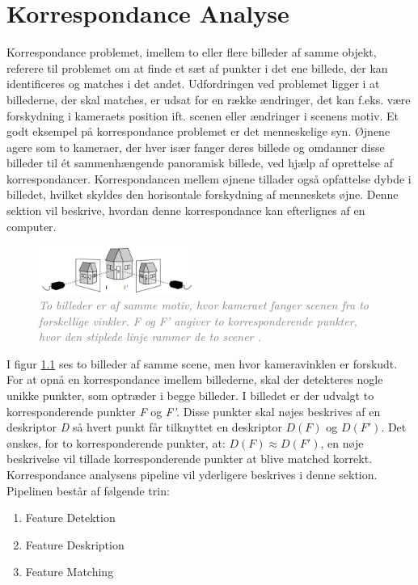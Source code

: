 \chapter{Korrespondance Analyse} \label{sec:Kor}
Korrespondance problemet, imellem to eller flere billeder af samme objekt, referere til problemet om at finde et sæt af punkter i det ene billede, der kan identificeres og matches i det andet.
Udfordringen ved problemet ligger i at billederne, der skal matches, er udsat for en række ændringer, det kan f.eks. være forskydning i kameraets position ift. scenen eller  ændringer i scenens motiv. Et godt eksempel på korrespondance problemet er det menneskelige syn. Øjnene agere som to kameraer, der hver især fanger deres billede og omdanner disse billeder til ét sammenhængende panoramisk billede, ved hjælp af oprettelse af korrespondancer. Korrespondancen mellem øjnene tillader også opfattelse dybde i billedet, hvilket skyldes den horisontale forskydning af menneskets øjne. Denne sektion vil beskrive, hvordan denne korrespondance kan efterlignes af en computer.
\begin{figure}[H]
    \centering
    \includegraphics[width=0.45\textwidth]{fig/3.png}
     \vspace{-1em}
    \begin{center}    
       \caption{\textcolor{gray}{\footnotesize \textit{To billeder er af samme motiv, hvor kameraet fanger scenen fra to forskellige vinkler. F og F' angiver to korresponderende punkter, hvor den stiplede linje rammer de to scener \cite{kim}.}}}
    \label{fig:1}
     \end{center}
     \vspace{-2.5em}
  \end{figure} \noindent
I figur \ref{fig:1} ses to billeder af samme scene, men hvor kameravinklen er forskudt. For at opnå en korrespondance imellem billederne, skal der detekteres nogle unikke punkter, som optræder i begge billeder. I billedet er der udvalgt to korresponderende punkter \textit{F} og \textit{F'}. Disse punkter skal nøjes beskrives af en deskriptor \textit{D} så hvert punkt får tilknyttet en deskriptor $D(F)$ og $D(F')$. Det ønskes, for to korresponderende punkter, at: $D(F)\approx D(F')$, en nøje beskrivelse vil tillade korresponderende punkter at blive matched korrekt. Korrespondance analysens pipeline vil yderligere beskrives i denne sektion. Pipelinen består af følgende trin:
\begin{enumerate}
\item{Feature Detektion}
\item{Feature Deskription}
\item{Feature Matching}
\end{enumerate}
